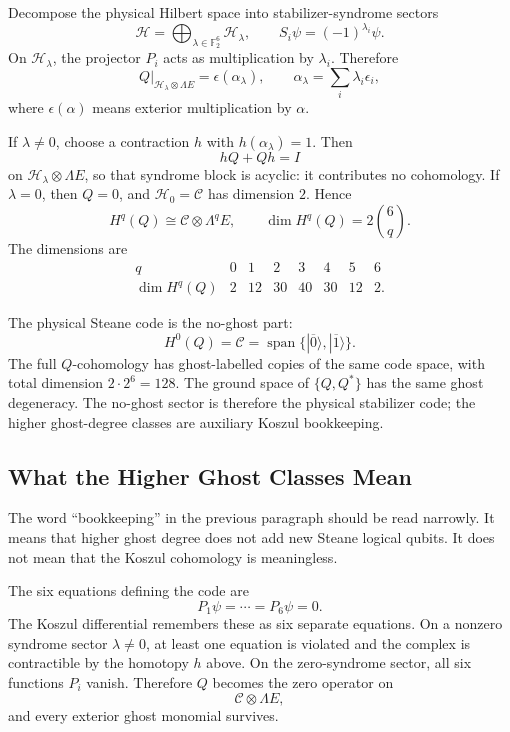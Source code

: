 Decompose the physical Hilbert space into stabilizer-syndrome sectors
\[
  \mathcal H=\bigoplus_{\lambda\in\mathbb F_2^6}\mathcal H_\lambda,
  \qquad
  S_i\psi=(-1)^{\lambda_i}\psi .
\]
On \(\mathcal H_\lambda\), the projector \(P_i\) acts as multiplication by
\(\lambda_i\). Therefore
\[
  Q|_{\mathcal H_\lambda\otimes\Lambda E}
  =
  \epsilon(\alpha_\lambda),
  \qquad
  \alpha_\lambda=\sum_i\lambda_i\epsilon_i,
\]
where \(\epsilon(\alpha)\) means exterior multiplication by \(\alpha\).

If \(\lambda\neq0\), choose a contraction \(h\) with \(h(\alpha_\lambda)=1\).
Then
\[
  hQ+Qh=I
\]
on \(\mathcal H_\lambda\otimes\Lambda E\), so that syndrome block is acyclic:
it contributes no cohomology. If \(\lambda=0\), then \(Q=0\), and
\(\mathcal H_0=\mathcal C\) has dimension \(2\). Hence
\[
  H^q(Q)\cong\mathcal C\otimes\Lambda^qE,
  \qquad
  \dim H^q(Q)=2\binom6q .
\]
The dimensions are
\[
\begin{array}{c|ccccccc}
q&0&1&2&3&4&5&6\\
\hline
\dim H^q(Q)&2&12&30&40&30&12&2 .
\end{array}
\]

The physical Steane code is the no-ghost part:
\[
  H^0(Q)=\mathcal C
  =
  \operatorname{span}\{|\overline0\rangle,|\overline1\rangle\}.
\]
The full \(Q\)-cohomology has ghost-labelled copies of the same code space,
with total dimension \(2\cdot2^6=128\). The ground space of
\(\{Q,Q^*\}\) has the same ghost degeneracy. The no-ghost sector is therefore
the physical stabilizer code; the higher ghost-degree classes are auxiliary
Koszul bookkeeping.

\subsection{What the Higher Ghost Classes Mean}

The word ``bookkeeping'' in the previous paragraph should be read narrowly. It
means that higher ghost degree does not add new Steane logical qubits. It does
not mean that the Koszul cohomology is meaningless.

The six equations defining the code are
\[
  P_1\psi=\cdots=P_6\psi=0.
\]
The Koszul differential remembers these as six separate equations. On a
nonzero syndrome sector \(\lambda\neq0\), at least one equation is violated and
the complex is contractible by the homotopy \(h\) above. On the zero-syndrome
sector, all six functions \(P_i\) vanish. Therefore \(Q\) becomes the zero
operator on
\[
  \mathcal C\otimes\Lambda E,
\]
and every exterior ghost monomial survives.

